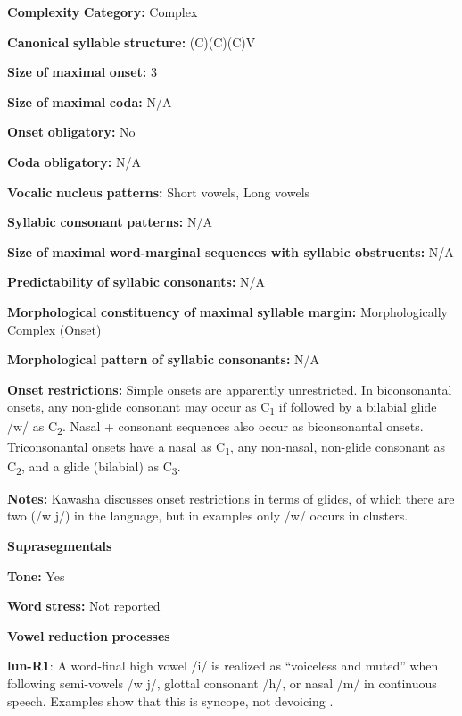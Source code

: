 \begin{styleBody}
\textbf{Complexity} \textbf{Category:} Complex

\textbf{Canonical} \textbf{syllable} \textbf{structure:} (C)(C)(C)V \citep[20-21]{Kawasha2003}

\textbf{Size} \textbf{of} \textbf{maximal} \textbf{onset:} 3

\textbf{Size} \textbf{of} \textbf{maximal} \textbf{coda:} N/A

\textbf{Onset} \textbf{obligatory:} No

\textbf{Coda} \textbf{obligatory:} N/A

\textbf{Vocalic} \textbf{nucleus} \textbf{patterns:} Short vowels, Long vowels

\textbf{Syllabic} \textbf{consonant} \textbf{patterns:} N/A

\textbf{Size} \textbf{of} \textbf{maximal} \textbf{word{}-marginal sequences with syllabic obstruents:} N/A

\textbf{Predictability} \textbf{of} \textbf{syllabic} \textbf{consonants:} N/A

\textbf{Morphological} \textbf{constituency} \textbf{of} \textbf{maximal} \textbf{syllable} \textbf{margin:} Morphologically Complex (Onset)

\textbf{Morphological} \textbf{pattern} \textbf{of} \textbf{syllabic} \textbf{consonants:} N/A

\textbf{Onset} \textbf{restrictions:} Simple onsets are apparently unrestricted. In biconsonantal onsets, any non-glide consonant may occur as C\textsubscript{1} if followed by a bilabial glide /w/ as C\textsubscript{2}. Nasal + consonant sequences also occur as biconsonantal onsets. Triconsonantal onsets have a nasal as C\textsubscript{1}, any non-nasal, non-glide consonant as C\textsubscript{2}, and a glide (bilabial) as C\textsubscript{3}.

\textbf{Notes:} Kawasha discusses onset restrictions in terms of glides, of which there are two (/w j/) in the language, but in examples only /w/ occurs in clusters.

\textbf{Suprasegmentals}

\textbf{Tone:} Yes

\textbf{Word} \textbf{stress:} Not reported

\textbf{Vowel} \textbf{reduction} \textbf{processes}

\textbf{lun-R1}: A word-final high vowel /i/ is realized as “voiceless and muted” when following semi-vowels /w j/, glottal consonant /h/, or nasal /m/ in continuous speech. Examples show that this is syncope, not devoicing \citep[37-8]{Kawasha2003}.


\end{styleBody}
